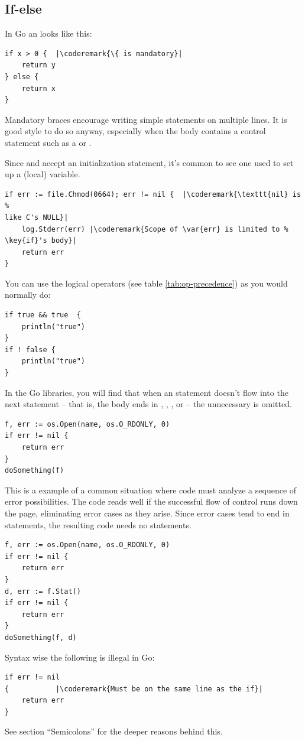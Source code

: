 \subsection{If-else}
In Go an  looks like this:
\begin{lstlisting}
if x > 0 {	|\coderemark{\{ is mandatory}|
    return y
} else {
    return x
}
\end{lstlisting}
Mandatory braces encourage writing simple  statements on multiple
lines. It is good style to do so anyway, especially when the body
contains a control statement such as a
 or
.

Since  and  accept an initialization statement, it's common to
see one used to set up a (local) variable.
\begin{lstlisting}
if err := file.Chmod(0664); err != nil {  |\coderemark{\texttt{nil} is %
like C's NULL}|
    log.Stderr(err) |\coderemark{Scope of \var{err} is limited to %
\key{if}'s body}|
    return err
}
\end{lstlisting}
You can use the logical operators (see table \ref{tab:op-precedence}) as
you would normally do:
\begin{lstlisting}
if true && true  {
    println("true")
}
if ! false {
    println("true")
}
\end{lstlisting}

In the Go libraries, you will find that when an  statement doesn't flow
into the next statement -- that is, the body ends in ,
, ,
or  -- the unnecessary  is omitted.

\begin{lstlisting}
f, err := os.Open(name, os.O_RDONLY, 0)
if err != nil {
    return err
}
doSomething(f)
\end{lstlisting}
This is a example of a common situation where code must analyze a
sequence of error possibilities. The code reads well if the successful
flow of control runs down the page, eliminating error cases as they
arise. Since error cases tend to end in  statements, the resulting
code needs no  statements.
\begin{lstlisting}
f, err := os.Open(name, os.O_RDONLY, 0)
if err != nil {
    return err
}
d, err := f.Stat()
if err != nil {
    return err
}
doSomething(f, d)
\end{lstlisting}
Syntax wise the following is illegal in Go:
\begin{lstlisting}
if err != nil
{		    |\coderemark{Must be on the same line as the if}|
    return err
}
\end{lstlisting}
See \cite{effective_go} section ``Semicolons'' for the deeper reasons
behind this.

